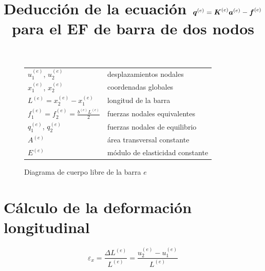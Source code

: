 \documentclass[12pt,letterpaper]{article}
\title{Deducción de la ecuación ${\boldsymbol{q}}^{(e)} = {\boldsymbol{K}}^{(e)} {\boldsymbol{a}}^{(e)} - {\boldsymbol{f}}^{(e)}$ para el EF de barra de dos nodos}
\date{}
\begin{document}
    \maketitle

\begin{figure}[ht]
    \centering

\vspace{0.5cm}

\begin{tabular}{ll}
    $u_1^{(e)}$, $u_2^{(e)}$                        & desplazamientos nodales       \\
    $x_1^{(e)}$, $x_2^{(e)}$                        & coordenadas globales          \\
    $L^{(e)}=x_2^{(e)} - x_1^{(e)}$                 & longitud de la barra          \\
    $f_1^{(e)}=f_2^{(e)}=\frac{b^{(e)} L^{(e)}}{2}$ & fuerzas nodales equivalentes  \\
    $q_1^{(e)}$, $q_2^{(e)}$                        & fuerzas nodales de equilibrio \\
    $A^{(e)}$                                       & área transversal constante    \\
    $E^{(e)}$                                       & módulo de elasticidad constante
\end{tabular}

    \caption{Diagrama de cuerpo libre de la barra $e$}
    \label{eq:fuerzas_sobre_EF}
\end{figure}



\section{Cálculo de la deformación longitudinal}
\begin{equation}
\varepsilon_x = \frac{\Delta L^{(e)}}{L^{(e)}} = \frac{u_2^{(e)} - u_1^{(e)}}{L^{(e)}}
\end{equation}
\end{document}
